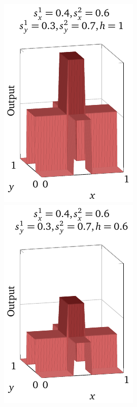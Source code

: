 \documentclass[a4paper,twoside,10pt]{book}
\begin{document}
\begin{center}
	\includegraphics[width=0.32\linewidth]{./figures/ch4/3d/bumpxy1}
	\includegraphics[width=0.32\linewidth]{./figures/ch4/3d/bumpxy2}
\end{center}
\end{document}
